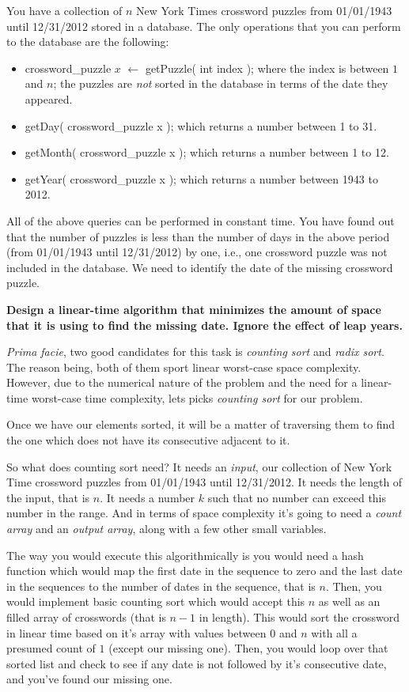 \documentclass[11pt]{article}
\begin{document}
You have a collection of $n$ New York Times
crossword puzzles from 01/01/1943 until 12/31/2012 stored in a
database. The only operations that you can perform to the database are
the following:
\begin{itemize}
\item crossword\_puzzle $x$ $\leftarrow$ getPuzzle( int index ); where the
  index is between $1$ and $n$; the puzzles are \emph{not} sorted in the
  database in terms of the date they appeared.
\item getDay( crossword\_puzzle x ); which returns a number between 1
  to 31.
\item getMonth( crossword\_puzzle x ); which returns a number between
  1 to 12.
\item getYear( crossword\_puzzle x ); which returns a number between
  1943 to 2012.
\end{itemize}
All of the above queries can be performed in constant time. You have
found out that the number of puzzles is less than the number of days
in the above period (from 01/01/1943 until 12/31/2012) by one, i.e.,
one crossword puzzle was not included in the database. We need to
identify the date of the missing crossword puzzle.

\textbf{Design a linear-time algorithm that minimizes the amount of space that
it is using to find the missing date. Ignore the effect of leap years.}

\emph{Prima facie}, two good candidates for this task is \emph{counting sort}
and \emph{radix sort}. The reason being, both of them sport linear worst-case
space complexity. However, due to the numerical nature of the problem and the
need for a linear-time worst-case time complexity, lets picks \emph{counting
sort} for our problem.

Once we have our elements sorted, it will be a matter of traversing them to find
the one which does not have its consecutive adjacent to it.

So what does counting sort need? It needs an \emph{input}, our collection of 
New York Time crossword puzzles from 01/01/1943 until 12/31/2012. It needs the
length of the input, that is $n$. It needs a number $k$ such that no number can
exceed this number in the range. And in terms of space complexity it's going
to need a \emph{count array} and an \emph{output array}, along with a few other
small variables.

The way you would execute this algorithmically is you would need a hash function
which would map the first date in the sequence to zero and the last date in the
sequences to the number of dates in the sequence, that is $n$. Then, you would
implement basic counting sort which would accept this $n$ as well as an filled
array of crosswords (that is $n - 1$ in length). This would sort the crossword
in linear time based on it's array with values between $0$ and $n$ with all
a presumed count of $1$ (except our missing one). Then, you would loop over that
sorted list and check to see if any date is not followed by it's consecutive date,
and you've found our missing one.
\end{document}
